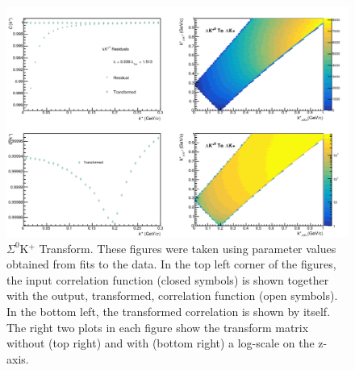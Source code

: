 \documentclass[../AnalysisNoteJBuxton.tex]{subfiles}
\begin{document}
\begin{figure}[h]
  \centering
  \includegraphics[width=\textwidth]{5_Fitting/Figures/Residuals_LamKchP_0010_LamKSt0_MomResCrctn_NonFlatBgdCrctn_10Res_PrimMaxDecay4fm_UsingXiDataAndCoulombOnly.pdf}
  \caption[$\Sigma^{0}$K$^{+}$ Transform]{$\Sigma^{0}$K$^{+}$ Transform.  These figures were taken using parameter values obtained from fits to the data.  In the top left corner of the figures, the input correlation function (closed symbols) is shown together with the output, transformed, correlation function (open symbols).  In the bottom left, the transformed correlation is shown by itself.  The right two plots in each figure show the transform matrix without (top right) and with (bottom right) a log-scale on the z-axis.}
  \label{fig:LamKSt0toLamKchPTransform}
\end{figure}

\clearpage
\end{document}
